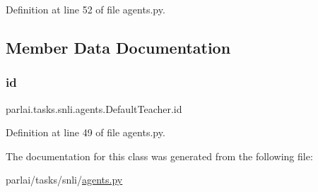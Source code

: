 Definition at line 52 of file agents.\+py.



\subsection{Member Data Documentation}
\mbox{\label{classparlai_1_1tasks_1_1snli_1_1agents_1_1DefaultTeacher_a53a712ad89d4c98e7501d2b307a6481c}} 
\subsubsection{\texorpdfstring{id}{id}}
{\footnotesize\ttfamily parlai.\+tasks.\+snli.\+agents.\+Default\+Teacher.\+id}



Definition at line 49 of file agents.\+py.



The documentation for this class was generated from the following file\+:\begin{DoxyCompactItemize}
\item 
parlai/tasks/snli/\hyperlink{parlai_2tasks_2snli_2agents_8py}{agents.\+py}\end{DoxyCompactItemize}

